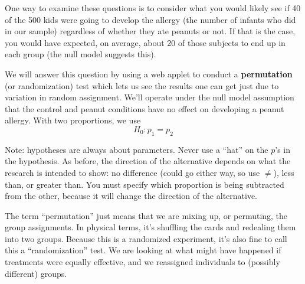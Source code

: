    One way to examine these questions is to consider what you would
   likely see if 
   40 of the 500 kids were going to develop the allergy (the number of
   infants  who did in our sample) regardless of whether they ate
   peanuts or not. If that is the case, you would have expected, on
   average, about 20 of those subjects to end up in each group
   (the null model suggests this). 

   We will answer this question by using a web applet to conduct a
   {\bf permutation} (or randomization) test which lets us see the
   results one can get just due to variation in random
   assignment. We'll operate under the null model assumption that the
   control and peanut conditions have no effect on developing a peanut
   allergy.  With two proportions, we use   $$H_0: p_1 = p_2$$

   Note: hypotheses are always about parameters. Never use a ``hat''
   on the $p$'s in the hypothesis.  As before, the direction of the
   alternative depends on what the research is intended to show: no
   difference (could go either way, so use $\neq$), less than, or
   greater than.  You must specify which proportion is being
   subtracted from the other, because it will change the direction of
   the alternative.
 
   The term ``permutation'' just means that we are mixing up, or
   permuting, the group assignments.  In physical terms, it's
   shuffling the cards and redealing them into two groups.  Because
   this is a randomized experiment, it's also fine to call this a
   ``randomization'' test.  We are looking at what might have happened
   if treatments were equally effective, and we reassigned individuals
   to (possibly different) groups.

